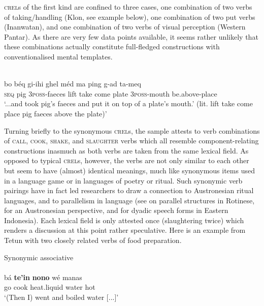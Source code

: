 \textsc{crel}s of the first kind are confined to three cases, one combination of two verbs of taking/handling (Klon, see example below), one combination of two put verbs (Inanwatan), and one combination of two verbs of visual perception (Western Pantar). As there are very few data points available, it seems rather unlikely that these combinations actually constitute full-fledged constructions with conventionalised mental templates.

\ea 
{}\\
\gll bo béq gi-ihi ghel méd ma ping g-ad ta-meq \\
\textsc{seq} pig \textsc{3}\textsc{poss}-faeces lift take come plate \textsc{3}\textsc{poss}-mouth be.above-place \\
\glft `...and took pig's faeces and put it on top of a plate's mouth.' (lit. lift take come place pig faeces above the plate)'\\ 
\z

Turning briefly to the synonymous \textsc{crel}s, the sample attests to verb combinations of \textsc{call}, \textsc{cook}, \textsc{shake}, and \textsc{slaughter} verbs which all resemble component-relating constructions inasmuch as both verbs are taken from the same lexical field. As opposed to typical \textsc{crel}s, however, the verbs are not only similar to each other but seem to have (almost) identical meanings, much like synonymous items used in a language game or in languages of poetry or ritual. Such synonymic verb pairings have in fact led researchers to draw a connection to Austronesian ritual languages, and to parallelism in language (see \citealt{fox1971semantic} on parallel structures in Rotinese, \citealt{fox2005ritual} for an Austronesian perspective, and \citealt{fox2006speak} for dyadic speech forms in Eastern Indonesia). Each lexical field is only attested once (slaughtering twice) which renders a discussion at this point rather speculative. Here is an example from Tetun with two closely related verbs of food preparation.

\ea Synonymic associative  \\
\\
\gll bá \textbf{te'in} \textbf{nono} wé manas \\
go cook heat.liquid water hot \\
\glft `(Then I) went and boiled water [...]'\\ 
\z

